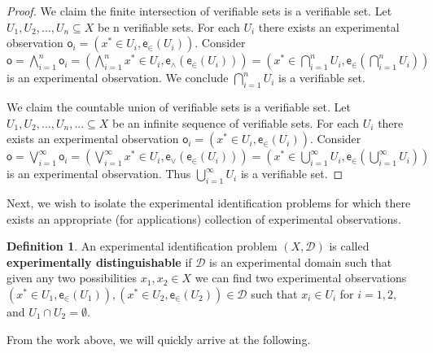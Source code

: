 \documentclass[review]{elsarticle}
\theoremstyle{plain}%
\theoremstyle{definition}
\newtheorem{defn}{Definition}[section]
\theoremstyle{remark}
\begin{document}
\begin{proof}
	We claim the finite intersection of verifiable sets is a verifiable set. Let $U_1, U_2, ... , U_n \subseteq X$ be n verifiable sets. For each $U_i$ there exists an experimental observation $\mathsf{o}_i = (x^*\in U_i, \mathsf{e}_\in(U_i))$. Consider $\mathsf{o} = \bigwedge\limits_{i=1}^{n} \mathsf{o}_i = (\bigwedge\limits_{i=1}^{n} x^*\in U_i , \mathsf{e}_{\wedge}(\mathsf{e}_\in(U_i)))=( x^*\in \bigcap\limits_{i=1}^{n} U_i, \mathsf{e}_\in(\bigcap\limits_{i=1}^{n} U_i))$ is an experimental observation. We conclude $\bigcap\limits_{i=1}^{n} U_i$ is a verifiable set.
	
	We claim the countable union of verifiable sets is a verifiable set. Let $U_1, U_2, ... , U_n, ... \subseteq X$ be an infinite sequence of verifiable sets. For each $U_i$ there exists an experimental observation $\mathsf{o}_i = (x^*\in U_i, \mathsf{e}_\in(U_i))$. Consider $\mathsf{o} = \bigvee\limits_{i=1}^{\infty} \mathsf{o}_i = (\bigvee\limits_{i=1}^{\infty} x^*\in U_i, \mathsf{e}_{\vee}(\mathsf{e}_\in(U_i)))=( x^*\in \bigcup\limits_{i=1}^{\infty} U_i, \mathsf{e}_\in(\bigcup\limits_{i=1}^{\infty} U_i))$ is an experimental observation. Thus $\bigcup\limits_{i=1}^{\infty} U_i$ is a verifiable set.
\end{proof}

Next, we wish to isolate the experimental identification problems for which there exists an appropriate (for applications) collection of experimental observations. 

\begin{defn}
An experimental identification problem $(X,\mathcal{D})$ is called \textbf{experimentally distinguishable} if $\mathcal{D}$ is an experimental domain such that given any two possibilities $x_1, x_2 \in X$ we can find two experimental observations $(x^*\in U_1, \mathsf{e}_\in(U_1)), (x^*\in U_2, \mathsf{e}_\in(U_2))\in\mathcal{D}$ such that $x_i\in U_i$ for $i=1,2$, and $U_1\cap U_2 = \emptyset$.
\end{defn}

From the work above, we will quickly arrive at the following.
\end{document}
